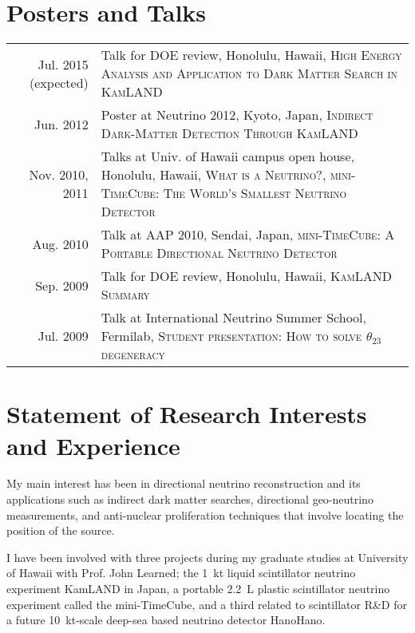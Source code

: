\documentclass[a4paper,10pt]{article} %
\begin{document}
\section{Posters and Talks}
\begin{tabular}{rp{11cm}}
	Jul. 2015 (expected) & Talk for DOE review, Honolulu, Hawaii,
	\textsc{High Energy Analysis and Application to Dark Matter Search in KamLAND}\\
	Jun. 2012 & Poster at Neutrino 2012, Kyoto, Japan, \textsc{Indirect
	Dark-Matter Detection Through KamLAND}\\
	Nov. 2010, 2011 & Talks at Univ. of Hawaii campus open house, Honolulu,
	Hawaii, \textsc{What is a Neutrino?}, \textsc{mini-TimeCube: The World's
		Smallest Neutrino Detector}\\
	Aug. 2010 & Talk at AAP 2010, Sendai, Japan, \textsc{mini-TimeCube: A
	Portable Directional Neutrino Detector}\\
	Sep. 2009 & Talk for DOE review, Honolulu, Hawaii, \textsc{KamLAND
Summary}\\
	Jul. 2009 & Talk at International Neutrino Summer School, Fermilab,
\textsc{Student presentation: How to solve $\theta_{23}$ degeneracy}\\
	
\end{tabular}


\section{Statement of Research Interests and Experience}
My main interest has been in directional neutrino reconstruction and its
applications such as indirect dark matter searches, directional geo-neutrino
measurements, and anti-nuclear proliferation techniques that involve locating
the position of the source.

I have been involved with three projects during my graduate studies at
University of Hawaii with Prof. John Learned; the \SI{1}{\kilo\tonne} liquid
scintillator neutrino experiment KamLAND in Japan, a portable
\SI{2.2}{\liter} plastic scintillator neutrino experiment called the
mini-TimeCube, and a third related to scintillator R\&D for a
future \SI{10}{\kilo\tonne}-scale deep-sea based neutrino detector HanoHano.
\end{document}
